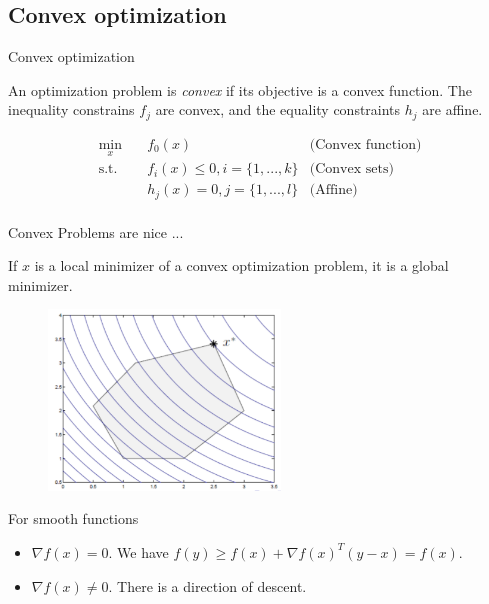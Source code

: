 \documentclass[notes]{beamer}
\begin{document}
\subsection{Convex optimization}

\begin{frame}{Convex optimization}
	\begin{define}
		An optimization problem is \emph{convex} if its objective is a convex function. The inequality constrains $f_j$ are convex, and the equality constraints $h_j$ are affine.
	\end{define}
	\begin{equation}
		\begin{aligned}
			\min_x \quad        & f_0(x)                        & \text{(Convex function)} \\
			\textrm{s.t.} \quad & f_i(x) \le 0, i = \{1,...,k\} & \text{(Convex sets)}     \\
			\quad               & h_j(x) = 0, j = \{1,...,l\}   & \text{(Affine)}          \\
		\end{aligned}
	\end{equation}
\end{frame}
\begin{frame}
	{Convex Problems are nice ...}
	\begin{thm}
		If $\hat{x}$ is a local minimizer of a convex optimization problem, it is a global minimizer.
	\end{thm}
	\begin{figure}
		\includegraphics[width=0.55\textwidth]{2018-03-05-12-00-04.png}
	\end{figure}

\end{frame}

\begin{frame}
	{For smooth functions}
	\begin{thm}
		\begin{itemize}
			\item $\nabla f(x)=0$. We have $f(y) \ge f(x)+\nabla f(x)^T (y-x) = f(x) $.
			\item  $\nabla f(x) \neq 0 $. There is a direction of descent.
		\end{itemize}
	\end{thm}
\end{frame}
\end{document}

